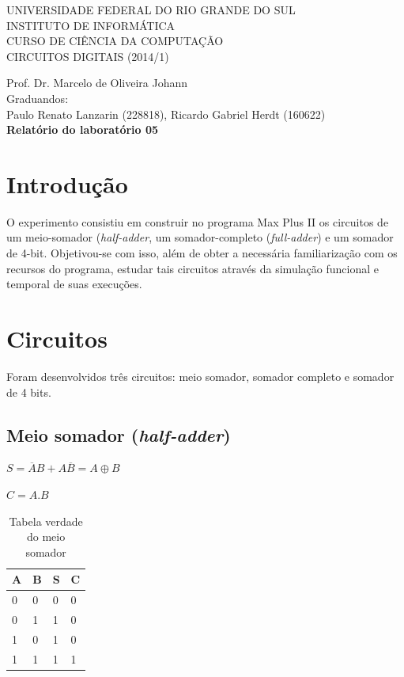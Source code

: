 \documentclass[a4paper]{article}
\begin{document}
\begin{center}


\large{ 
\uppercase{ Universidade Federal do Rio Grande do Sul\\

Instituto de Informática \\

Curso de Ciência da Computação \\

Circuitos Digitais (2014/1)\\
}

Prof. Dr. Marcelo de Oliveira Johann \\

Graduandos: \\ Paulo Renato Lanzarin (228818), Ricardo Gabriel Herdt (160622) \\[1cm]

\bfseries Relatório do laboratório 05\\[1.0cm]
}

\end{center}
\section{Introdução}

	O experimento consistiu em construir no programa Max Plus II os
circuitos de um meio-somador (\emph{half-adder}, um somador-completo
(\emph{full-adder}) e um somador de 4-bit.  Objetivou-se com isso, além de
obter a necessária familiarização com os recursos do programa, estudar tais
circuitos através da simulação funcional e temporal de suas execuções.


\section{Circuitos}

Foram desenvolvidos três circuitos: meio somador, somador completo e somador de
4 bits.

\subsection{Meio somador (\emph{half-adder})}

$S = \overline{A}B + A\overline{B} = A \oplus B $

$C = A . B$

\begin{table}[h]
\centering
\begin{tabular}{| l | l | l | l |}
	\hline
	A	&B	&S	&C	\\
	\hline
	0	&0	&0	&0	\\
	0	&1	&1	&0	\\
	1	&0	&1	&0	\\
	1	&1	&1	&1	\\
	\hline
\end{tabular}
\caption{Tabela verdade do meio somador}
\end{table}
\end{document}
